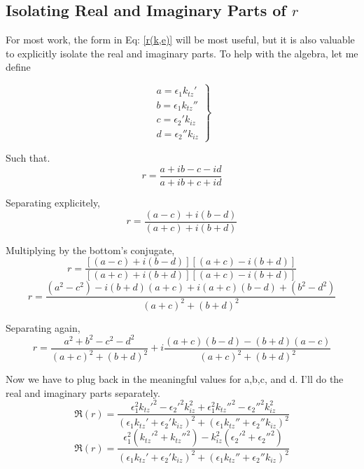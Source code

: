 \documentclass[10pt,a4paper]{article}
\begin{document}
\subsection{Isolating Real and Imaginary Parts of $r$}
For most work, the form in Eq: \ref{r(k,e)} will be most useful, but it is also valuable to explicitly isolate the real and imaginary parts.  To help with the algebra, let me define

\begin{equation}
\left.
\begin{aligned}
a=\epsilon_1k_{tz}' \\
b=\epsilon_1k_{tz}'' \\
c=\epsilon_2'k_{iz} \\
d=\epsilon_2''k_{iz}
\end{aligned}
\right\}
\end{equation}

Such that.
\begin{equation}
r=\frac{a+ib-c-id}{a+ib+c+id}
\end{equation}

Separating explicitely,
\begin{equation}
r=\frac{(a-c)+i(b-d)}{(a+c)+i(b+d)}
\end{equation}

Multiplying by the bottom's conjugate,
\begin{equation}
r=\frac{[(a-c)+i(b-d)][(a+c)-i(b+d)]}{[(a+c)+i(b+d)][(a+c)-i(b+d)]}
\end{equation}
\begin{equation}
r=\frac{(a^2-c^2)-i(b+d)(a+c)+i(a+c)(b-d)+(b^2-d^2)}{(a+c)^2+(b+d)^2}
\end{equation}

Separating again,
\begin{equation}
r=\frac{a^2+b^2-c^2-d^2}{(a+c)^2+(b+d)^2}+i\frac{(a+c)(b-d)-(b+d)(a-c)}{(a+c)^2+(b+d)^2}
\end{equation}

Now we have to plug back in the meaningful values for a,b,c, and d. I'll do the real and imaginary parts separately.
\begin{equation}
\Re(r)=\frac{\epsilon_1^2k_{tz}'^2-\epsilon_2'^2k_{iz}^2+\epsilon_1^2k_{tz}''^2-\epsilon_2''^2k_{iz}^2}{(\epsilon_1k_{tz}'+\epsilon_2'k_{iz})^2+(\epsilon_1k_{tz}''+\epsilon_2''k_{iz})^2}
\end{equation}
\begin{equation}\boxed{
\Re(r)=\frac{\epsilon_1^2(k_{tz}'^2+k_{tz}''^2)-k_{iz}^2(\epsilon_2'^2+\epsilon_2''^2)}{(\epsilon_1k_{tz}'+\epsilon_2'k_{iz})^2+(\epsilon_1k_{tz}''+\epsilon_2''k_{iz})^2}
}\end{equation}
\end{document}
